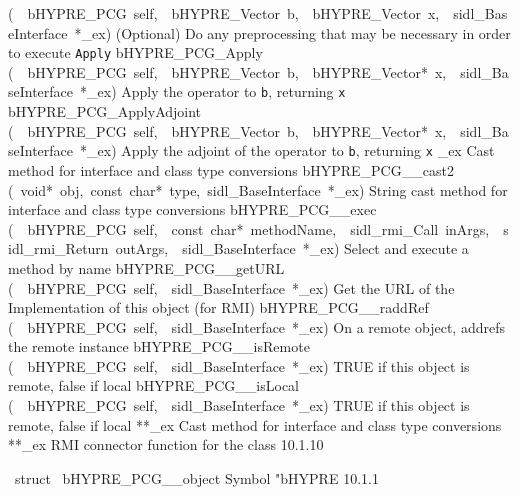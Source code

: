 \documentclass{article}
\begin{document}
\begin{cxxentry}
\begin{cxxentry}
\begin{cxxnames}
        {(\ \ bHYPRE\_PCG\ self,\ \ bHYPRE\_Vector\ b,\ \ bHYPRE\_Vector\ x,\ \ sidl\_BaseInterface\ *\_ex)}
        {
(Optional) Do any preprocessing that may be necessary in
order to execute {\tt Apply}}
        {}
\label{cxx.10.1.29}
        {bHYPRE\_PCG\_Apply}
        {(\ \ bHYPRE\_PCG\ self,\ \ bHYPRE\_Vector\ b,\ \ bHYPRE\_Vector*\ x,\ \ sidl\_BaseInterface\ *\_ex)}
        {
Apply the operator to {\tt b}, returning {\tt x}}
        {}
\label{cxx.10.1.30}
        {bHYPRE\_PCG\_ApplyAdjoint}
        {(\ \ bHYPRE\_PCG\ self,\ \ bHYPRE\_Vector\ b,\ \ bHYPRE\_Vector*\ x,\ \ sidl\_BaseInterface\ *\_ex)}
        {
Apply the adjoint of the operator to {\tt b}, returning {\tt x}}
        {}
\label{cxx.10.1.31}
        {\_ex}
        {}
        {
Cast method for interface and class type conversions}
        {}
\label{cxx.10.1.32}
        {bHYPRE\_PCG\_\_cast2}
        {(\ void*\ obj,\ const\ char*\ type,\ sidl\_BaseInterface\ *\_ex)}
        {
String cast method for interface and class type conversions}
        {}
\label{cxx.10.1.33}
        {bHYPRE\_PCG\_\_exec}
        {(\ \ bHYPRE\_PCG\ self,\ \ const\ char*\ methodName,\ \ sidl\_rmi\_Call\ inArgs,\ \ sidl\_rmi\_Return\ outArgs,\ \ sidl\_BaseInterface\ *\_ex)}
        {
Select and execute a method by name}
        {}
\label{cxx.10.1.34}
        {bHYPRE\_PCG\_\_getURL}
        {(\ \ bHYPRE\_PCG\ self,\ \ sidl\_BaseInterface\ *\_ex)}
        {
Get the URL of the Implementation of this object (for RMI)}
        {}
\label{cxx.10.1.35}
        {bHYPRE\_PCG\_\_raddRef}
        {(\ \ bHYPRE\_PCG\ self,\ \ sidl\_BaseInterface\ *\_ex)}
        {
On a remote object, addrefs the remote instance}
        {}
\label{cxx.10.1.36}
        {bHYPRE\_PCG\_\_isRemote}
        {(\ \ bHYPRE\_PCG\ self,\ \ sidl\_BaseInterface\ *\_ex)}
        {
TRUE if this object is remote, false if local}
        {}
\label{cxx.10.1.37}
        {bHYPRE\_PCG\_\_isLocal}
        {(\ \ bHYPRE\_PCG\ self,\ \ sidl\_BaseInterface\ *\_ex)}
        {
TRUE if this object is remote, false if local}
        {}
\label{cxx.10.1.38}
        {**\_ex}
        {}
        {
Cast method for interface and class type conversions}
        {}
\label{cxx.10.1.39}
        {**\_ex}
        {}
        {
RMI connector function for the class}
        {10.1.10}
\end{cxxnames}
\begin{cxxvariable}
{\ struct\ }
        {bHYPRE\_PCG\_\_object}
        {}
        {
Symbol "bHYPRE}
        {10.1.1}
\begin{cxxdoc}


\end{cxxdoc}
\end{cxxvariable}
\end{cxxentry}
\end{cxxentry}
\end{document}

